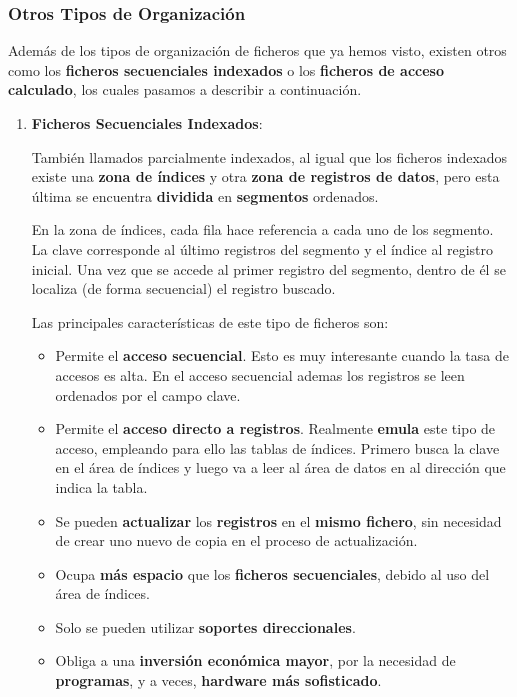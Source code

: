 \subsubsection{Otros Tipos de Organización}
Además de los tipos de organización de ficheros que ya hemos visto, existen otros como los \textbf{ficheros secuenciales indexados} o los \textbf{ficheros de acceso calculado}, los cuales pasamos a describir a continuación.

\begin{enumerate}[label=(\alph*)]
    \item \textbf{Ficheros Secuenciales Indexados}:

    También llamados parcialmente indexados, al igual que los ficheros indexados existe una \textbf{zona de índices} y otra \textbf{zona de registros de datos}, pero esta última se encuentra \textbf{dividida} en \textbf{segmentos} ordenados.

    En la zona de índices, cada fila hace referencia a cada uno de los segmento. La clave corresponde al último registros del segmento y el índice al registro inicial. Una vez que se accede al primer registro del segmento, dentro de él se localiza (de forma secuencial) el registro buscado.

    Las principales características de este tipo de ficheros son:
    \begin{itemize}
        \item Permite el \textbf{acceso secuencial}. Esto es muy interesante cuando la tasa de accesos es alta. En el acceso secuencial ademas los registros se leen ordenados por el campo clave.
        \item Permite el \textbf{acceso directo a registros}. Realmente \textbf{emula} este tipo de acceso, empleando para ello las tablas de índices. Primero busca la clave en el área de índices y luego va a leer al área de datos en al dirección que indica la tabla.
        \item Se pueden \textbf{actualizar} los \textbf{registros} en el \textbf{mismo fichero}, sin necesidad de crear uno nuevo de copia en el proceso de actualización.
        \item Ocupa \textbf{más espacio} que los \textbf{ficheros secuenciales}, debido al uso del área de índices.
        \item Solo se pueden utilizar \textbf{soportes direccionales}.
        \item Obliga a una \textbf{inversión económica mayor}, por la necesidad de \textbf{programas}, y a veces, \textbf{hardware más sofisticado}.
    \end{itemize}


\end{enumerate}
